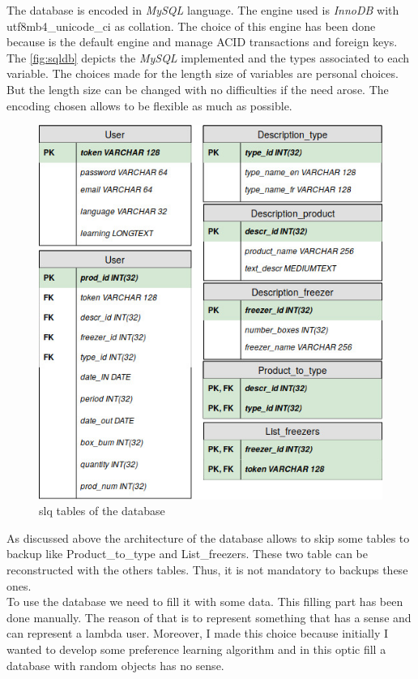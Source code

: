 The database is encoded in \textit{MySQL} language. The engine used is \textit{InnoDB} with utf8mb4\_unicode\_ci as collation. The choice of this engine has been done because is the default engine and manage ACID transactions and foreign keys. The \autoref{fig:sqldb} depicts the \textit{MySQL} implemented and the types associated to each variable. The choices made for the length size of variables are personal choices. But the length size can be changed with no difficulties if the need arose. The encoding chosen allows to be flexible as much as possible.

\begin{figure}[H]
\centering
\includegraphics[scale=0.5]{./images/sqldb.jpg}
\caption{slq tables of the database}
\label{fig:sqldb}
\end{figure}

As discussed above the architecture of the database allows to skip some tables to backup like Product\_to\_type and List\_freezers. These two table can be reconstructed with the others tables. Thus, it is not mandatory to backups these ones.\\

To use the database we need to fill it with some data. This filling part has been done manually. The reason of that is to represent something that has a sense and can represent a lambda user. Moreover, I made this choice because initially I wanted to develop some preference learning algorithm and in this optic fill a database with random objects has no sense. 


